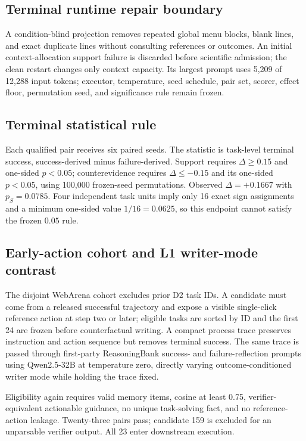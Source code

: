 \subsection{Terminal runtime repair boundary}
A condition-blind projection removes repeated global menu blocks, blank lines, and exact duplicate lines without consulting references or outcomes. An initial context-allocation support failure is discarded before scientific admission; the clean restart changes only context capacity. Its largest prompt uses 5,209 of 12,288 input tokens; executor, temperature, seed schedule, pair set, scorer, effect floor, permutation seed, and significance rule remain frozen.

\subsection{Terminal statistical rule}
Each qualified pair receives six paired seeds. The statistic is task-level terminal success, success-derived minus failure-derived. Support requires $\Delta\geq0.15$ and one-sided $p<0.05$; counterevidence requires $\Delta\leq-0.15$ and its one-sided $p<0.05$, using 100,000 frozen-seed permutations. Observed $\Delta=+0.1667$ with $p_S=0.0785$. Four independent task units imply only 16 exact sign assignments and a minimum one-sided value $1/16=0.0625$, so this endpoint cannot satisfy the frozen $0.05$ rule.

\subsection{Early-action cohort and L1 writer-mode contrast}
The disjoint WebArena cohort excludes prior D2 task IDs. A candidate must come from a released successful trajectory and expose a visible single-click reference action at step two or later; eligible tasks are sorted by ID and the first 24 are frozen before counterfactual writing. A compact process trace preserves instruction and action sequence but removes terminal success. The same trace is passed through first-party ReasoningBank success- and failure-reflection prompts using Qwen2.5-32B at temperature zero, directly varying outcome-conditioned writer mode while holding the trace fixed.

Eligibility again requires valid memory items, cosine at least 0.75, verifier-equivalent actionable guidance, no unique task-solving fact, and no reference-action leakage. Twenty-three pairs pass; candidate 159 is excluded for an unparsable verifier output. All 23 enter downstream execution.

